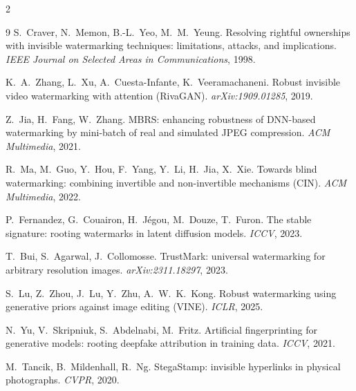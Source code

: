 \documentclass{article} %
\begin{document}
\begingroup
\footnotesize
\setlength{\bibsep}{0pt}
\begin{multicols}{2}
\begin{thebibliography}{9}
S.~Craver, N.~Memon, B.-L.~Yeo, M.~M.~Yeung.
Resolving rightful ownerships with invisible watermarking techniques: limitations, attacks, and implications.
\textit{IEEE Journal on Selected Areas in Communications}, 1998.

K.~A.~Zhang, L.~Xu, A.~Cuesta-Infante, K.~Veeramachaneni.
Robust invisible video watermarking with attention (RivaGAN).
\textit{arXiv:1909.01285}, 2019.

Z.~Jia, H.~Fang, W.~Zhang.
MBRS: enhancing robustness of DNN-based watermarking by mini-batch of real and simulated JPEG compression.
\textit{ACM Multimedia}, 2021.

R.~Ma, M.~Guo, Y.~Hou, F.~Yang, Y.~Li, H.~Jia, X.~Xie.
Towards blind watermarking: combining invertible and non-invertible mechanisms (CIN).
\textit{ACM Multimedia}, 2022.

P.~Fernandez, G.~Couairon, H.~J\'egou, M.~Douze, T.~Furon.
The stable signature: rooting watermarks in latent diffusion models.
\textit{ICCV}, 2023.

T.~Bui, S.~Agarwal, J.~Collomosse.
TrustMark: universal watermarking for arbitrary resolution images.
\textit{arXiv:2311.18297}, 2023.

S.~Lu, Z.~Zhou, J.~Lu, Y.~Zhu, A.~W.~K.~Kong.
Robust watermarking using generative priors against image editing (VINE).
\textit{ICLR}, 2025.

N.~Yu, V.~Skripniuk, S.~Abdelnabi, M.~Fritz.
Artificial fingerprinting for generative models: rooting deepfake attribution in training data.
\textit{ICCV}, 2021.

M.~Tancik, B.~Mildenhall, R.~Ng.
StegaStamp: invisible hyperlinks in physical photographs.
\textit{CVPR}, 2020.
\end{thebibliography}
\end{multicols}
\endgroup
\end{document}
